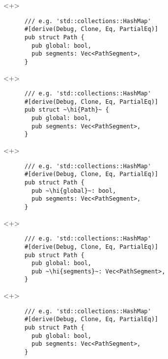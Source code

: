 \documentclass[usepdftitle=false]{beamer}
\renewcommand{\&}{\makebox[\widthof{\ampersand}][c]{\scalebox{0.9}[1.0]{\Book\ampersand}}}
\newcommand{\+}{\makebox[\widthof{+}][c]{\raisebox{-.2\height}{\scalefont{1.5}\Light+}}}
\newcommand{\hi}[1]{%
\tikz[baseline=(A.base)]
 \node[highlighting=0,inner sep=0pt,text depth=0pt] (A) {#1};%
}
\begin{document}

\begin{frame}[fragile]
  \begin{onlyenv}<+>
    \begin{verbatim}
      /// e.g. 'std::collections::HashMap'
      #[derive(Debug, Clone, Eq, PartialEq)]
      pub struct Path {
        pub global: bool,
        pub segments: Vec<PathSegment>,
      }
    \end{verbatim}
  \end{onlyenv}
  \begin{onlyenv}<+>
    \begin{verbatim}
      /// e.g. 'std::collections::HashMap'
      #[derive(Debug, Clone, Eq, PartialEq)]
      pub struct ~\hi{Path}~ {
        pub global: bool,
        pub segments: Vec<PathSegment>,
      }
    \end{verbatim}
  \end{onlyenv}
  \begin{onlyenv}<+>
    \begin{verbatim}
      /// e.g. 'std::collections::HashMap'
      #[derive(Debug, Clone, Eq, PartialEq)]
      pub struct Path {
        pub ~\hi{global}~: bool,
        pub segments: Vec<PathSegment>,
      }
    \end{verbatim}
  \end{onlyenv}
  \begin{onlyenv}<+>
    \begin{verbatim}
      /// e.g. 'std::collections::HashMap'
      #[derive(Debug, Clone, Eq, PartialEq)]
      pub struct Path {
        pub global: bool,
        pub ~\hi{segments}~: Vec<PathSegment>,
      }
    \end{verbatim}
  \end{onlyenv}
  \begin{onlyenv}<+>
    \begin{verbatim}
      /// e.g. 'std::collections::HashMap'
      #[derive(Debug, Clone, Eq, PartialEq)]
      pub struct Path {
        pub global: bool,
        pub segments: Vec<PathSegment>,
      }
    \end{verbatim}
  \end{onlyenv}
\end{frame}
\end{document}
